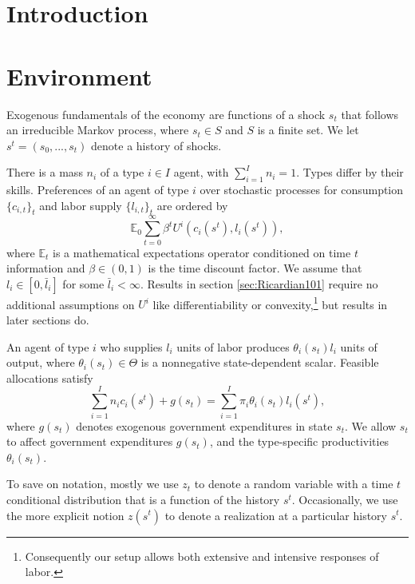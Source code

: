 \documentclass[11.5pt,twoside]{article}
\begin{document}
\section{Introduction}
\section{Environment\label{Sec: environment}}

\smallskip  %
Exogenous fundamentals
of the
economy are  functions of a shock  $s_{t}$  that follows an irreducible Markov process, where $s_{t}\in S$ and $S$ is a finite set. We let $s^{t}=\left(
s_{0},...,s_{t}\right) $ denote a history of shocks.

There is a mass $n _{i}$
of a type $i\in I$ agent, with $\sum_{i=1}^{I}n _{i}=1.$ Types differ by their skills.
Preferences of an
agent of type $i$ over stochastic processes for consumption $\{c_{i,t}\}_t$
and labor supply $\{l_{i,t}\}_t$ are ordered by
\begin{equation}
\mathbb{E}_{0}\sum_{t=0}^{\infty } \beta^t U^{i}\left(
c_{i}(s^t),l_{i}(s^t)\right),  \label{utility lifetime}
\end{equation}%
where $\mathbb{E}_{t}$ is a mathematical expectations operator conditioned
on time $t$ information and $\beta \in \left( 0,1\right) $ is the time discount factor. We assume that $l_{i}\in \left[ 0,\bar{l}_{i}\right] $ for some $%
\bar{l}_{i}<\infty .$ Results in section  \ref{sec:Ricardian101} require no
additional assumptions on $U^{i}$ like  differentiability or convexity,\footnote{Consequently  our setup allows both extensive and intensive responses of labor.}  but results in later sections do.

An agent of type $i$ who supplies $l_{i}$ units of labor produces $\theta
_{i}\left( s_t\right) l_{i}$ units of output, where $\theta _{i}(s_t)\in \Theta $
is a nonnegative state-dependent scalar. Feasible allocations satisfy
\begin{equation}%
\sum_{i=1}^{I}n_{i}c_{i}(s^t)+g\left( s_{t}\right) =\sum_{i=1}^{I}\pi
_{i}\theta _{i}\left( s_{t}\right) l_{i}(s^t),  \label{feasibility goods}
\end{equation}%
where $g\left( s_{t}\right) $ denotes exogenous government expenditures in
state $s_{t}.$
 We allow $s_t$ to
affect government expenditures $g(s_t)$, and the type-specific productivities $\theta_i(s_t)$.

To save on notation, mostly we
use $z_{t}$ to denote a random variable with a time $t$ conditional
distribution that is a function of the history $s^{t}$.
 Occasionally, we use the more explicit notion $z\left(
s^{t}\right) $ to denote a realization  at
a particular history $s^{t}.$
\end{document}
